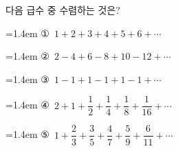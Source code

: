 다음 급수 중 수렴하는 것은?
\par\medskip\par\noindent\hangindent=1.4em {\small ①}\ $1+2+3+4+5+6+\cdots$\par\noindent\hangindent=1.4em {\small ②}\ $2-4+6-8+10-12+\cdots$\par\noindent\hangindent=1.4em {\small ③}\ $1-1+1-1+1-1+\cdots$\par\noindent\hangindent=1.4em {\small ④}\ $2+1+\dfrac{1}{2}+\dfrac{1}{4}+\dfrac{1}{8}+\dfrac{1}{16}+\cdots$\par\noindent\hangindent=1.4em {\small ⑤}\ $1+\dfrac{2}{3}+\dfrac{3}{5}+\dfrac{4}{7}+\dfrac{5}{9}+\dfrac{6}{11}+\cdots$\par\medskip
